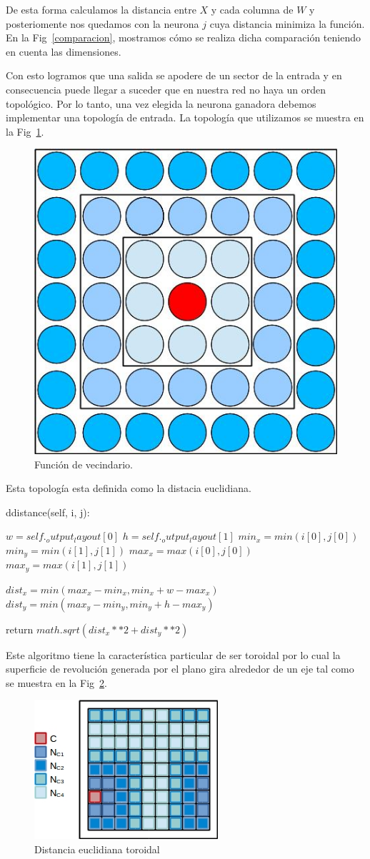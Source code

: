 De esta forma calculamos la distancia entre $X$ y cada columna de $W$ y posteriomente nos quedamos con la neurona $j$ cuya distancia minimiza la función. En la Fig~\ref{comparacion}, mostramos cómo se realiza dicha comparación teniendo en cuenta las dimensiones.

Con esto logramos que una salida se apodere de un sector de la entrada y en consecuencia puede llegar a suceder que en nuestra red no haya un orden topológico. Por lo tanto, una vez elegida la neurona ganadora debemos implementar una topología de entrada. La topología que utilizamos se muestra en la Fig~\ref{vecindario}.

\begin{figure}[ht!]
	\centering
	\includegraphics[width=0.3\linewidth]{img/parte2-vecindario.jpg}
	\caption{Función de vecindario.}
	\label{vecindario}
\end{figure}

Esta topología esta definida como la distacia euclidiana. 

\begin{algorithm}
	\caption{ddistance(self, i, j):}
	\begin{algorithmic}
		\State $w = self._output_layout[0]$
		\State $h = self._output_layout[1]$
		\State $min_x = min(i[0], j[0])$
		\State $min_y = min(i[1], j[1])$
		\State $max_x = max(i[0], j[0])$
		\State $max_y = max(i[1], j[1])$

		\State $dist_x = min(max_x-min_x, min_x + w - max_x)$
		\State $dist_y = min(max_y - min_y, min_y + h - max_y)$

		\State return $math.sqrt(dist_x**2 + dist_y**2)$
	\end{algorithmic}
\end{algorithm}

Este algoritmo tiene la característica particular de ser toroidal por lo cual la superficie de revolución generada por el plano gira alrededor de un eje tal como se muestra en la Fig~\ref{dist-euclideana}.

\begin{figure}[ht!]
	\centering
	\includegraphics[width=0.5\linewidth]{img/parte2-toroidal.jpg}
	\caption{Distancia euclidiana toroidal}
	\label{dist-euclideana}
\end{figure}

